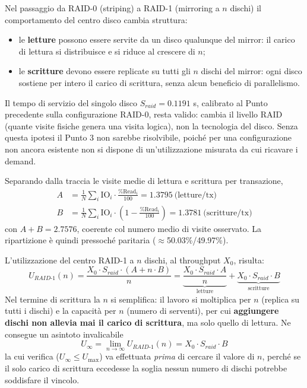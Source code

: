 \documentclass[11pt,a4paper]{article}
\begin{document}
Nel passaggio da RAID-0 (striping) a RAID-1 (mirroring a $n$ dischi) il comportamento del
centro disco cambia struttura:
\begin{itemize}
\item le \textbf{letture} possono essere servite da un disco qualunque del mirror: il carico di
lettura si distribuisce e si riduce al crescere di $n$;
\item le \textbf{scritture} devono essere replicate su tutti gli $n$ dischi del mirror: ogni disco
sostiene per intero il carico di scrittura, senza alcun beneficio di parallelismo.
\end{itemize}
Il tempo di servizio del singolo disco $S_{raid}=0.1191$ s, calibrato al Punto precedente sulla
configurazione RAID-0, resta valido: cambia il livello RAID (quante visite fisiche genera una
visita logica), non la tecnologia del disco. Senza questa ipotesi il Punto 3 non sarebbe risolvibile,
poiché per una configurazione non ancora esistente non si dispone di un'utilizzazione misurata da
cui ricavare i demand.

Separando dalla traccia le visite medie di lettura e scrittura per transazione,
\begin{align}
A &= \frac{1}{N}\sum_i \text{IO}_i\cdot\frac{\%\text{Read}_i}{100}
   = 1.3795\ \text{(letture/tx)} \\
B &= \frac{1}{N}\sum_i \text{IO}_i\cdot\left(1-\frac{\%\text{Read}_i}{100}\right)
   = 1.3781\ \text{(scritture/tx)}
\end{align}
con $A+B=2.7576$, coerente col numero medio di visite osservato. La ripartizione è quindi
pressoché paritaria ($\approx$50.03\%/49.97\%).

L'utilizzazione del centro RAID-1 a $n$ dischi, al throughput $X_0$, risulta:
\begin{equation}
U_{RAID\text{-}1}(n) = \frac{X_0\cdot S_{raid}\cdot(A + n\cdot B)}{n}
= \underbrace{\frac{X_0\cdot S_{raid}\cdot A}{n}}_{\text{letture}} + \underbrace{X_0\cdot S_{raid}\cdot B}_{\text{scritture}}
\label{eq:uraid1}
\end{equation}
Nel termine di scrittura la $n$ si semplifica: il lavoro si moltiplica per $n$ (replica su tutti i
dischi) e la capacità per $n$ (numero di serventi), per cui \textbf{aggiungere dischi non allevia mai
il carico di scrittura}, ma solo quello di lettura. Ne consegue un asintoto invalicabile
\begin{equation}
U_\infty = \lim_{n\to\infty} U_{RAID\text{-}1}(n) = X_0\cdot S_{raid}\cdot B
\end{equation}
la cui verifica ($U_\infty \le U_{\max}$) va effettuata \emph{prima} di cercare il valore di $n$, perché
se il solo carico di scrittura eccedesse la soglia nessun numero di dischi potrebbe soddisfare il
vincolo.
\end{document}
